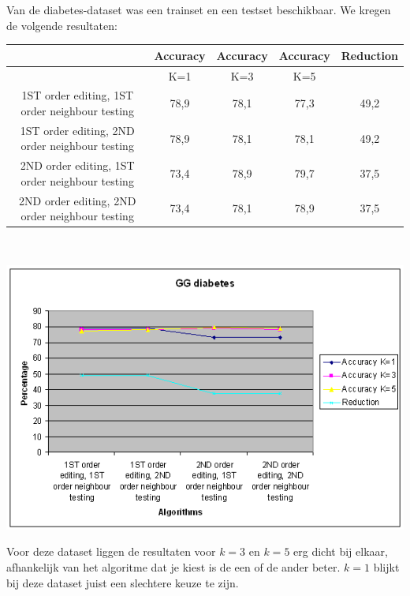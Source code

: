 \documentclass{article}
\begin{document}
Van de diabetes-dataset was een trainset en een testset beschikbaar. We kregen de volgende resultaten:\\
\begin{tabular}{|c|c|c|c|c|}  \hline
	& Accuracy	&Accuracy &Accuracy &	Reduction \\ \hline
	& K=1 &	K=3 &	K=5	& \\ \hline
1ST order editing, 1ST order neighbour testing &	78,9 &	78,1 &	77,3	& 49,2 \\
1ST order editing, 2ND order neighbour testing &	78,9 &	78,1 &	78,1 &	49,2 \\
2ND order editing, 1ST order neighbour testing &	73,4 &	78,9 &	79,7 &	37,5 \\
2ND order editing, 2ND order neighbour testing &	73,4 &	78,1 &	78,9 &	37,5 \\ \hline
\end{tabular} \\
\begin{center} \includegraphics[scale=0.7]{GG_diabetes} \end{center}

Voor deze dataset liggen de resultaten voor $k=3$ en $k=5$ erg dicht bij elkaar, afhankelijk van het algoritme dat je kiest is de een of de ander beter. $k=1$ blijkt bij deze dataset juist een slechtere keuze te zijn.

\end{document}
